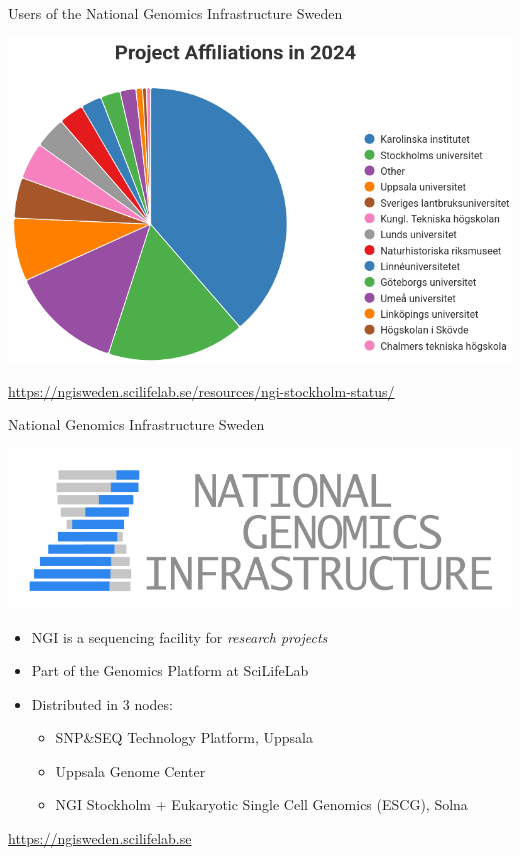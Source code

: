 \documentclass[10pt]{beamer}
\newcommand{\credit}[1]{{\vspace{\fill} \par \raggedleft \scriptsize \mdseries \color{mDarkBrown} #1 \par}}
\begin{document}
\begin{frame}{Users of the National Genomics Infrastructure Sweden}
	\begin{center}
		\hspace*{-1cm}
		\includegraphics[height=0.7\textheight]{./figures/ngi-users-2024.png}
	\end{center}
	\credit{\href{https://ngisweden.scilifelab.se/resources/ngi-stockholm-status/}{https://ngisweden.scilifelab.se/resources/ngi-stockholm-status/}}
\end{frame}

\begin{frame}{National Genomics Infrastructure Sweden}
	\begin{center}
		\hspace*{-1cm}
		\includegraphics[height=0.2\textheight]{./additional_graphics/NGI-logo.png}
	\end{center}
	\begin{itemize}
		\item NGI is a sequencing facility for \emph{research projects} 
		\item Part of the Genomics Platform at SciLifeLab
		\item Distributed in 3 nodes:
		\begin{itemize}
			\item SNP\&SEQ Technology Platform, Uppsala
			\item Uppsala Genome Center
			\item NGI Stockholm + Eukaryotic Single Cell Genomics (ESCG), Solna 
		\end{itemize}
	\end{itemize}
	\credit{\href{https://ngisweden.scilifelab.se}{https://ngisweden.scilifelab.se}}
\end{frame}
\end{document}
